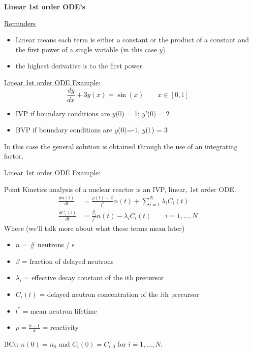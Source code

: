 \documentclass[12pt]{article}
\begin{document}
\vspace*{1em}
\textbf{Linear 1st order ODE's}

\underline{Reminders}
\begin{itemize}
\item Linear means each term is either a constant or the product of a constant and the first power of a single variable (in this case $y$).
\item the highest derivative is to the first power.
\end{itemize}

\underline{Linear 1st order ODE Example}:
\begin{equation}
\frac{dy}{dx} + 3y(x) = \sin(x) \qquad x \in [0, 1] \nonumber
\end{equation}
%
\begin{itemize}
\item IVP if boundary conditions are $y$(0) = 1; $y$'(0) = 2
\item BVP if boundary conditions are $y$(0)=-1, $y$(1) = 3 
\end{itemize}
%
In this case the general solution is obtained through the use of an integrating factor.

\vspace*{1em}
\noindent \underline{Linear 1st order ODE Example}:

Point Kinetics analysis of a nuclear reactor is an IVP, linear, 1st order ODE.
%
\begin{align}
\frac{dn(t)}{dt} &= \frac{\rho(t) - \beta}{l^*}n(t) + \sum_{i=1}^{N} \lambda_i C_i(t) \nonumber \\
%
\frac{dC_i(t)}{dt} &= \frac{\beta_i}{l^*}n(t) - \lambda_i C_i(t) \qquad i=1,\dots,N \nonumber
\end{align}
%
Where (we'll talk  more about what these terms mean later)
%
\begin{itemize}
\item $n$ = \# neutrons / s
\item $\beta$ = fraction of delayed neutrons
\item $\lambda_i$ = effective decay constant of the ith precursor
\item $C_i(t)$ = delayed neutron concentration of the ith precursor
\item $l^*$ = mean neutron lifetime
\item $\rho = \frac{k-1}{k}$ = reactivity
\end{itemize}
%
BCs: $n(0) = n_0$ and $C_i(0) = C_{i,0}$ for $i=1,\dots,N$.
\end{document}
